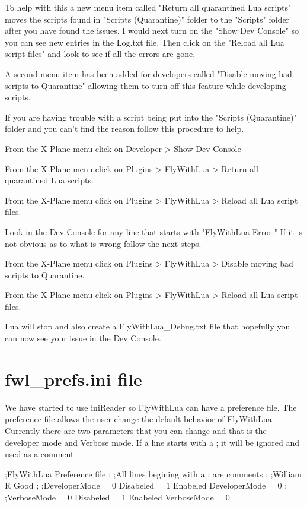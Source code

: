 \documentclass[11pt,parskip=half,a4paper]{scrartcl}
\begin{document}
To help with this a new menu item called "Return all quarantined Lua scripts" moves the scripts found  in "Scripts (Quarantine)" folder to the "Scripts" folder after you have found the issues. I would next turn on the "Show Dev Console" so you can see new entries in the Log.txt file. Then click on the "Reload all Lua script files" and look to see if all the errors are gone.

A second menu item has been added for developers called "Disable moving bad scripts to Quarantine" allowing them to turn off this feature while developing scripts. \newline

If you are having trouble with a script being put into the "Scripts (Quarantine)" folder and you can't find the reason follow this procedure to help. \newline

From the X-Plane menu click on Developer > Show Dev Console

From the X-Plane menu click on Plugins > FlyWithLua > Return all quarantined Lua scripts.

From the X-Plane menu click on Plugins > FlyWithLua > Reload all Lua script files.

Look in the Dev Console for any line that starts with "FlyWithLua Error:" If it is not obvious as to what is wrong follow the next steps.

From the X-Plane menu click on Plugins > FlyWithLua > Disable moving bad scripts to Quarantine.
 
From the X-Plane menu click on Plugins > FlyWithLua > Reload all Lua script files.

Lua will stop and also create a FlyWithLua\_Debug.txt file that hopefully you can now see your issue in the Dev Console.


\newpage
\section{fwl\_prefs.ini file}

We have started to use iniReader so FlyWithLua can have a preference file. The preference file allows the user change the default behavior of FlyWithLua. Currently there are two parameters that you can change and that is the developer mode and Verbose mode. If a line starts with a ; it will be ignored and used as a comment. \newline

;FlyWithLua Preference file \newline
; \newline
;All lines begining with a ; are comments \newline
; \newline
;William R Good \newline
; \newline
;DeveloperMode = 0 Disabeled  = 1 Enabeled \newline
DeveloperMode = 0 \newline
; \newline
;VerboseMode = 0 Disabeled  = 1 Enabeled \newline
VerboseMode = 0 \newline
\end{document}
